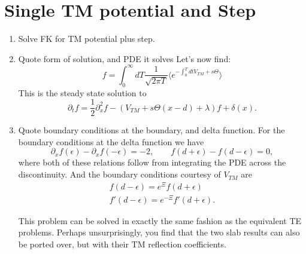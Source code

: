 \section{Single TM potential and Step}

\begin{enumerate}
  \item {Solve FK for TM potential plus step. }
  \item Quote form of solution, and PDE it solves
    Let's now find: 
    \begin{equation}
      f = \int_0^\infty dT \frac{1}{\sqrt{2\pi T}}\langle e^{-\int_0^T dt V_{TM} + s\Theta}\rangle 
    \end{equation}
    This is the steady state solution to 
    \begin{equation}
      \partial_t f = \frac{1}{2}\partial_x^2f -(V_{TM} + s\Theta(x-d)+\lambda)f +\delta(x). 
    \end{equation}

  \item Quote boundary conditions at the boundary, and delta function.  
    For the boundary conditions at the delta function we have 
    \begin{equation}
      \partial_xf(\epsilon) -\partial_x f(-\epsilon) = -2 , \qquad f(d+\epsilon)-f(d-\epsilon) = 0,
    \end{equation}
    where both of these relations follow from integrating the PDE across the discontinuity.
    And the boundary conditions courtesy of $V_{TM}$ are
    \begin{align}
      f(d-\epsilon) = e^{\Xi}f(d+\epsilon)\\
      f'(d-\epsilon) = e^{-\Xi}f'(d+\epsilon).
    \end{align}

    This problem can be solved in exactly the same fashion as the equivalent TE problems.
    Perhaps unsurprisingly, you find that the two slab results can also be ported over, but with their TM reflection coefficients.  


\end{enumerate}
